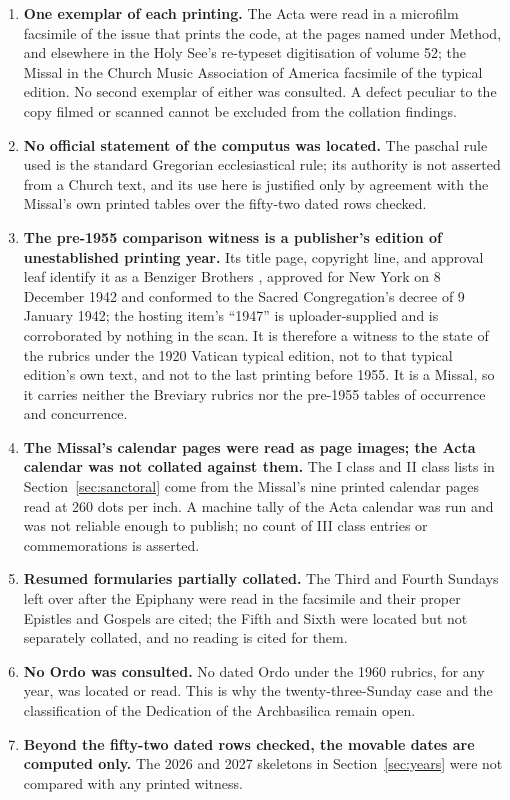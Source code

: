 \begin{enumerate}[leftmargin=1.6em, itemsep=0.25em]
\item \textbf{One exemplar of each printing.} The Acta were read in a microfilm facsimile of the
issue that prints the code, at the pages named under Method, and elsewhere in the Holy See's
re-typeset digitisation of volume 52; the Missal in the Church Music Association of America
facsimile of the typical edition. No second exemplar of either was consulted. A defect peculiar
to the copy filmed or scanned cannot be excluded from the collation findings.
\item \textbf{No official statement of the computus was located.} The paschal rule used is the
standard Gregorian ecclesiastical rule; its authority is not asserted from a Church text, and
its use here is justified only by agreement with the Missal's own printed tables over the
fifty-two dated rows checked.
\item \textbf{The pre-1955 comparison witness is a publisher's edition of unestablished printing
year.} Its title page, copyright line, and approval leaf identify it as a Benziger Brothers
, approved for New York on 8 December 1942 and
conformed to the Sacred Congregation's decree of 9 January 1942; the hosting item's ``1947'' is
uploader-supplied and is corroborated by nothing in the scan. It is therefore a witness to the
state of the rubrics under the 1920 Vatican typical edition, not to that typical edition's own
text, and not to the last printing before 1955. It is a Missal, so it carries neither the
Breviary rubrics nor the pre-1955 tables of occurrence and concurrence.
\item \textbf{The Missal's calendar pages were read as page images; the Acta calendar was not
collated against them.} The I class and II class lists in Section~\ref{sec:sanctoral} come from
the Missal's nine printed calendar pages read at 260 dots per inch. A machine tally of the Acta
calendar was run and was not reliable enough to publish; no count of III class entries or
commemorations is asserted.
\item \textbf{Resumed formularies partially collated.} The Third and Fourth Sundays left over
after the Epiphany were read in the facsimile and their proper Epistles and Gospels are cited;
the Fifth and Sixth were located but not separately collated, and no reading is cited for them.
\item \textbf{No Ordo was consulted.} No dated Ordo under the 1960 rubrics, for any year, was
located or read. This is why the twenty-three-Sunday case and the classification of the
Dedication of the Archbasilica remain open.
\item \textbf{Beyond the fifty-two dated rows checked, the movable dates are computed only.}
The 2026 and 2027 skeletons in Section~\ref{sec:years} were not compared with any printed
witness.
\end{enumerate}

